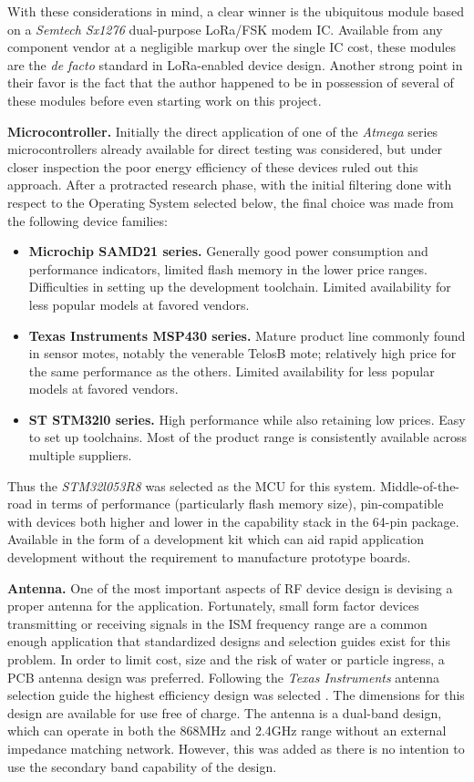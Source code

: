 \documentclass[10pt,nocopyrightspace]{ewsn-proc}
\begin{document}
With these considerations in mind, a clear winner is the ubiquitous module based on a \textit{Semtech Sx1276} dual-purpose LoRa/FSK modem IC. Available from any component vendor at a negligible markup over the single IC cost, these modules are the \textit{de facto} standard in LoRa-enabled device design. Another strong point in their favor is the fact that the author happened to be in possession of several of these modules before even starting work on this project.

\textbf{Microcontroller.} Initially the direct application of one of the \textit{Atmega} series microcontrollers already available for direct testing was considered, but under closer inspection the poor energy efficiency of these devices ruled out this approach. After a protracted research phase, with the initial filtering done with respect to the Operating System selected below, the final choice was made from the following device families:
\begin{itemize}
\item \textbf{Microchip SAMD21 series.} Generally good power consumption and performance indicators, limited flash memory in the lower price ranges. Difficulties in setting up the development toolchain. Limited availability for less popular models at favored vendors.
\item \textbf{Texas Instruments MSP430 series.} Mature product line commonly found in sensor motes, notably the venerable TelosB mote; relatively high price for the same performance as the others. Limited availability for less popular models at favored vendors.
\item \textbf{ST STM32l0 series.} High performance while also retaining low prices. Easy to set up toolchains. Most of the product range is consistently available across multiple suppliers.
\end{itemize}
Thus the \textit{STM32l053R8} was selected as the MCU for this system. Middle-of-the-road in terms of performance (particularly flash memory size), pin-compatible with devices both higher and lower in the capability stack in the 64-pin package. Available in the form of a development kit which can aid rapid application development without the requirement to manufacture prototype boards.

\textbf{Antenna.} One of the most important aspects of RF device design is devising a proper antenna for the application. Fortunately, small form factor devices transmitting or receiving signals in the ISM frequency range are a common enough application that standardized designs and selection guides exist for this problem. In order to limit cost, size and the risk of water or particle ingress, a PCB antenna design was preferred. Following the \textit{Texas Instruments} antenna selection guide \cite{antenna-select} the highest efficiency design was selected \cite{antenna-datasheet}. The dimensions for this design are available for use free of charge. The antenna is a dual-band design, which can operate in both the 868MHz and 2.4GHz range without an external impedance matching network. However, this was added as there is no intention to use the secondary band capability of the design.
\end{document}
